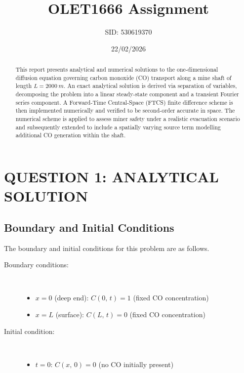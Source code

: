 \documentclass[a4paper,12pt]{article} %
\title{OLET1666 Assignment}
\author{SID: 530619370}
\date{22/02/2026}
\begin{document}
\pagestyle{fancy}
\fancyhf{} %
\fancyfoot[C]{\thepage}                   %
\renewcommand{\headrulewidth}{0.4pt}      %

\maketitle

\begin{abstract}
This report presents analytical and numerical solutions to the one-dimensional diffusion equation governing carbon monoxide (CO) transport along a mine shaft of length $L = \SI{2000}{m}$. An exact analytical solution is derived via separation of variables, decomposing the problem into a linear steady-state component and a transient Fourier series component. A Forward-Time Central-Space (FTCS) finite difference scheme is then implemented numerically and verified to be second-order accurate in space. The numerical scheme is applied to assess miner safety under a realistic evacuation scenario and subsequently extended to include a spatially varying source term modelling additional CO generation within the shaft.
\end{abstract}

\tableofcontents
\newpage
\listoffigures
\listoftables
\newpage


\section{QUESTION 1: ANALYTICAL SOLUTION}

\subsection{Boundary and Initial Conditions}
\label{sec:bcs}
The boundary and initial conditions for this problem are as follows.

\begin{description}
    \item[Boundary conditions:]~
    \begin{itemize}
        \item $x = 0$ (deep end): $C(0,\, t) = 1$ \quad (fixed CO concentration)
        \item $x = L$ (surface): $C(L,\, t) = 0$ \quad (fixed CO concentration)
    \end{itemize}
    \item[Initial condition:]~
    \begin{itemize}
        \item $t = 0$: $C(x,\, 0) = 0$ \quad (no CO initially present)
    \end{itemize}
\end{description}
\end{document}
